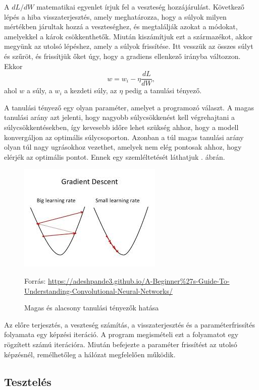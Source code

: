 A $dL/dW$ matematikai egyenlet írjuk fel a veszteség hozzájárulást. Következő lépés a hiba visszaterjesztés, amely meghatározza, hogy a súlyok milyen mértékben járultak hozzá a veszteséghez, és megtalálják azokat a módokat, amelyekkel a károk csökkenthetők. Miután kiszámítjuk ezt a származékot, akkor megyünk az utolsó lépéshez, amely a súlyok frissítése. Itt vesszük az összes súlyt és szűröt, és frissítjük őket úgy, hogy a gradiens ellenkező irányba változzon. Ekkor
$$
w = w_i - \eta \dfrac{dL}{dW},
$$
ahol $w$ a súly, a $w_i$ a kezdeti súly, az $\eta$ pedig a tanulási tényező.

A tanulási tényező egy olyan paraméter, amelyet a programozó választ. A magas tanulási arány azt jelenti, hogy nagyobb súlycsökkenést kell végrehajtani a súlycsökkentésekben, így kevesebb időre lehet szükség ahhoz, hogy a modell konvergáljon az optimális súlycsoporton. Azonban a túl magas tanulási arány olyan túl nagy ugrásokhoz vezethet, amelyek nem elég pontosak ahhoz, hogy elérjék az optimális pontot. Ennek egy szemléltetését láthatjuk . ábrán.

\begin{figure}[h]
\centering
\includegraphics[scale=0.8]{images/CNN_learning_rate}
\caption{Magas és alacsony tanulási tényezők hatása}
Forrás: \url{https://adeshpande3.github.io/A-Beginner%27s-Guide-To-Understanding-Convolutional-Neural-Networks/}
\label{fig:CNN_learning_rate}
\end{figure}

Az előre terjesztés, a veszteség számítás, a visszaterjesztés és a paraméterfrissítés folyamata egy képzési iteráció. A program megismételi ezt a folyamatot egy rögzített számú iterációra. Miután befejezte a paraméter frissítést az utolsó képzésnél, remélhetőleg a hálózat megfelelően működik.

\subsection{Tesztelés}

